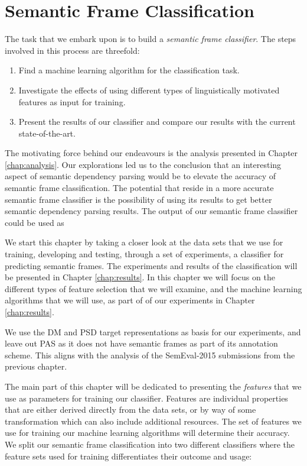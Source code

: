 \chapter{Semantic Frame Classification}
\label{chap:experiments}

The task that we embark upon is to build a \textit{semantic frame classifier}. The steps involved in this process are threefold: 

\begin{enumerate}
    \item Find a machine learning algorithm for the classification task.
    \item Investigate the effects of using different types of linguistically motivated features as input for training.
    \item Present the results of our classifier and compare our results with the current state-of-the-art.
\end{enumerate}

The motivating force behind our endeavours is the analysis presented in Chapter \ref{chap:analysis}. Our explorations led us to the conclusion that an interesting aspect of semantic dependency parsing would be to elevate the accuracy of semantic frame classification. The potential that reside in a more accurate semantic frame classifier is the possibility of using its results to get better semantic dependency parsing results. The output of our semantic frame classifier could be used as 

We start this chapter by taking a closer look at the data sets that we use for training, developing and testing, through a set of experiments, a classifier for predicting semantic frames. The experiments and results of the classification will be presented in Chapter \ref{chap:results}. In this chapter we will focus on the different types of feature selection that we will examine, and the machine learning algorithms that we will use, as part of of our experiments in Chapter \ref{chap:results}.

We use the DM and PSD target representations as basis for our experiments, and leave out PAS as it does not have semantic frames as part of its annotation scheme. This aligns with the analysis of the SemEval-2015 submissions from the previous chapter.

The main part of this chapter will be dedicated to presenting the \textit{features} that we use as parameters for training our classifier. Features are individual properties that are either derived directly from the data sets, or by way of some transformation which can also include additional resources. The set of features we use for training our machine learning algorithms will determine their accuracy. We split our semantic frame classification into two different classifiers where the feature sets used for training differentiates their outcome and usage:

